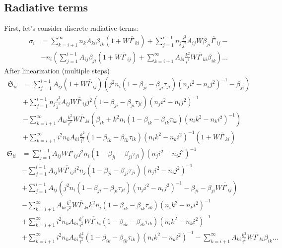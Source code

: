 \documentclass{article}
\begin{document}
\subsection{Radiative terms}
First, let's consider discrete radiative terms:
\begin{equation}
    \begin{aligned}
        \sigma_i &= \sum\limits_{k=i+1}^\infty n_kA_{ki}\beta_{ik}(1 + W\overline{I^\star}_{ki}) + \sum\limits_{j=1}^{i-1} n_j\frac{i^2}{j^2}A_{ij}W\beta_{ji} \overline{I^\star}_{ij} -\\
        &-n_i\left(\sum\limits_{j=1}^{i-1}A_{ij}\beta_{ji}(1 + W\overline{I^\star}_{ij}) + \sum\limits_{k=i+1}^\infty A_{ki}\frac{k^2}{i^2}W\overline{I^\star}_{ki}\beta_{ik}\right)\dots 
    \end{aligned}
\end{equation}
After linearization (multiple steps)
\begin{equation}
    \begin{aligned}
        \mathfrak{S}_{ii} &= \sum\limits_{j=1}^{i-1} A_{ij}(1 + W\overline{I^\star}_{ij})\left(j^2n_i (1 - \beta_{ji} - \beta_{ji}\tau_{ji})(n_ji^2 - n_ij^2)^{-1} -\beta_{ji}\right)\\
        &+\sum\limits_{j=1}^{i-1} n_j\frac{i^2}{j^2}A_{ij}W\overline{I^\star}_{ij}j^2(1 - \beta_{ji} - \beta_{ji}\tau_{ji})(n_ji^2 - n_ij^2)^{-1}\\
        &-\sum\limits_{k=i+1}^\infty A_{ki}\frac{k^2}{i^2}W\overline{I^\star}_{ki}(\beta_{ik} + k^2n_i(1 - \beta_{ik} - \beta_{ik}\tau_{ik})(n_ik^2 - n_ki^2)^{-1})\\
        &+\sum\limits_{k=i+1}^\infty i^2n_kA_{ki}\frac{k^2}{i^2}(1 - \beta_{ik} - \beta_{ik}\tau_{ik})(n_ik^2 - n_ki^2)^{-1}(1 + W\overline{I^\star}_{ki})
    \end{aligned}
\end{equation}
\begin{equation}
    \begin{aligned}
        \mathfrak{S}_{ii} &= \sum\limits_{j=1}^{i-1} A_{ij}W\overline{I^\star}_{ij}j^2n_i (1 - \beta_{ji} - \beta_{ji}\tau_{ji})(n_ji^2 - n_ij^2)^{-1}\\
        &-\sum\limits_{j=1}^{i-1} A_{ij}W\overline{I^\star}_{ij}i^2n_j(1 - \beta_{ji} - \beta_{ji}\tau_{ji})(n_ji^2 - n_ij^2)^{-1}\\
        &+\sum\limits_{j=1}^{i-1} A_{ij}\left(j^2n_i (1 - \beta_{ji} - \beta_{ji}\tau_{ji})(n_ji^2 - n_ij^2)^{-1} -\beta_{ji}-\beta_{ji}W\overline{I^\star}_{ij}\right)\\
        &-\sum\limits_{k=i+1}^\infty A_{ki}\frac{k^2}{i^2}W\overline{I^\star}_{ki}k^2n_i(1 - \beta_{ik} - \beta_{ik}\tau_{ik})(n_ik^2 - n_ki^2)^{-1}\\
        &+\sum\limits_{k=i+1}^\infty i^2n_kA_{ki}\frac{k^2}{i^2}W\overline{I^\star}_{ki}(1 - \beta_{ik} - \beta_{ik}\tau_{ik})(n_ik^2 - n_ki^2)^{-1}\\
        &+\sum\limits_{k=i+1}^\infty i^2n_kA_{ki}\frac{k^2}{i^2}(1 - \beta_{ik} - \beta_{ik}\tau_{ik})(n_ik^2 - n_ki^2)^{-1}-\sum\limits_{k=i+1}^\infty A_{ki}\frac{k^2}{i^2}W\overline{I^\star}_{ki}\beta_{ik}\dots
    \end{aligned}
\end{equation}
\end{document}
